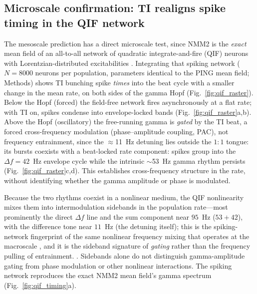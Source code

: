 \documentclass[11pt,a4paper]{article}
\providecommand{\DIFaddtex}[1]{{\protect\color{blue} \sf #1}} %
\providecommand{\DIFdeltex}[1]{{\protect\color{red} \scriptsize #1}} %
\providecommand{\DIFaddbegin}{} %
\providecommand{\DIFaddend}{} %
\providecommand{\DIFdelbegin}{} %
\providecommand{\DIFdelend}{} %
\providecommand{\DIFadd}[1]{\texorpdfstring{\DIFaddtex{#1}}{#1}} %
\providecommand{\DIFdel}[1]{\texorpdfstring{\DIFdeltex{#1}}{}} %
\begin{document}
\subsection{Microscale confirmation: TI realigns spike timing in the QIF network}\label{sec:qif}
The mesoscale prediction has a direct microscale test, since NMM2 is the \emph{exact} mean
field of an all-to-all network of quadratic integrate-and-fire (QIF) neurons with
Lorentzian-distributed excitabilities
\cite{montbrio2015,ruffini2025rosetta,clusella2023}. Integrating that spiking network
($N=8000$ neurons per population, parameters identical to the PING mean field; Methods)
shows TI bunching spike \emph{times} into the beat cycle with a smaller change in the mean
rate, on both sides of the gamma Hopf (Fig.~\ref{fig:qif_raster}). Below the Hopf (forced)
the field-free network fires asynchronously at a flat rate; with TI on, spikes condense
into envelope-locked bands (Fig.~\ref{fig:qif_raster}a,b). Above the Hopf (oscillatory) the
free-running gamma \DIFdelbegin \DIFdel{is \emph{gated} by the TI beat, a forced cross-frequency modulation
(phase--amplitude coupling, PAC), not frequency entrainment, since the $\approx$11~Hz detuning lies outside the
$1{:}1$ tongue: its bursts }\DIFdelend \DIFaddbegin \DIFadd{coexists with a beat-locked rate component: spikes }\DIFaddend group into
the $\Delta f=42$~Hz \DIFdelbegin \DIFdel{envelope }\DIFdelend \DIFaddbegin \DIFadd{cycle }\DIFaddend while the intrinsic $\sim$53~Hz \DIFdelbegin \DIFdel{gamma }\DIFdelend \DIFaddbegin \DIFadd{rhythm }\DIFaddend persists
(Fig.~\ref{fig:qif_raster}c,d). \DIFaddbegin \DIFadd{This establishes cross-frequency structure in the
rate, without identifying whether the gamma amplitude or phase is modulated.
}\DIFaddend

Because the two rhythms coexist
in a nonlinear medium, the QIF nonlinearity mixes them into intermodulation sidebands in
the population rate---most prominently the direct $\Delta f$ line and the sum component near
$95$~Hz ($53\!+\!42$), with the difference tone near $11$~Hz (the detuning itself); this is
the spiking-network fingerprint of the same nonlinear frequency mixing that operates at the
macroscale\DIFdelbegin \DIFdel{, and it is the sideband signature of \emph{gating} rather than the frequency
pulling of entrainment. }\DIFdelend \DIFaddbegin \DIFadd{. Sidebands alone do not distinguish gamma-amplitude gating from phase
modulation or other nonlinear interactions. }\DIFaddend The spiking network reproduces
the exact NMM2 mean field's gamma spectrum (Fig.~\ref{fig:qif_timing}a).
\end{document}
